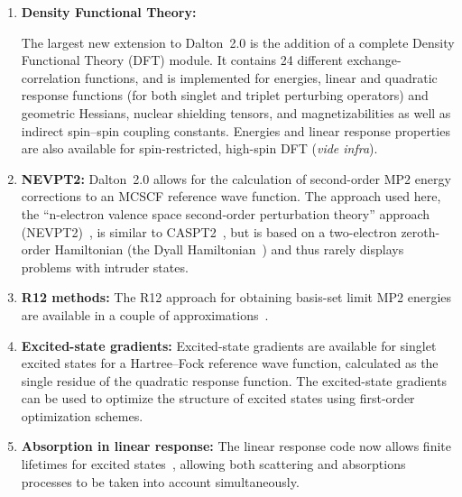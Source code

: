 \begin{enumerate}
\item{\bf Density Functional Theory:}

The largest new extension to Dalton~2.0 is the addition of a complete
Density Functional Theory (DFT) module. It contains 24 different
exchange-correlation  functions,
 and is implemented for energies,
linear and quadratic response functions (for both singlet and triplet
perturbing operators) and geometric Hessians, nuclear shielding
tensors, and magnetizabilities as well as indirect spin--spin coupling
constants. Energies and linear response properties are also available
for spin-restricted, high-spin DFT ({\em vide infra\/}).



\item{\bf NEVPT2:} Dalton~2.0 allows for the calculation of
  second-order MP2 energy corrections to an MCSCF reference wave
  function. The approach used here, the ``n-electron valence space
  second-order perturbation theory'' approach (NEVPT2)~\cite{carcsetljpmjcp114,carcjpmcpl350,carcjpmjcp117}, is similar to
  CASPT2~\cite{kapamborjcp96}, but is based on a two-electron zeroth-order
  Hamiltonian (the Dyall Hamiltonian~\cite{kgdjcp102}) and thus rarely displays
  problems with intruder states.

\item{\bf R12 methods:} The R12 approach for obtaining basis-set limit
MP2 energies are available in a couple of  approximations~\cite{wkccmsjcp116,ccmswkthcpc149}.

\item{\bf Excited-state gradients:} Excited-state gradients are
  available for singlet excited states for a Hartree--Fock reference
  wave function, calculated as the single residue of the quadratic
  response function. The excited-state gradients can be used to
  optimize the structure of excited states using first-order
  optimization schemes.

\item{\bf Absorption in linear response:} The linear response code now
  allows finite lifetimes for excited states~\cite{pndmbhjajjojcp115}, allowing both scattering
  and absorptions processes to be taken into account simultaneously.


\end{enumerate}

